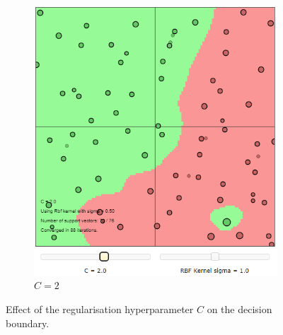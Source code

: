 \documentclass{article}
\begin{document}
\begin{figure}[h]
\begin{subfigure}[b]{0.3\textwidth}
                 \includegraphics[width=\textwidth]{Assignment 1/figures/RBF_high_regularisation.png}
                 \caption{$C = 2$}
                 \label{fig:rbf_high_regularisation}
             \end{subfigure}
             \hspace{0.15\textwidth}
            \caption{Effect of the regularisation hyperparameter $C$ on the decision boundary.}
        \end{figure}
    
\end{document}
